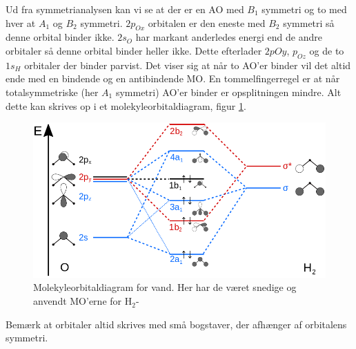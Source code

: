 \documentclass[../main.tex]{subfiles}
\begin{document}
Ud fra symmetrianalysen kan vi se at der er en AO med $B_1$ symmetri og to med hver at $A_1$ og $B_2$ symmetri.
$2p_{Ox}$ orbitalen er den eneste med $B_2$ symmetri så denne orbital binder ikke. $2s_O$ har markant anderledes energi end de andre orbitaler så denne orbital binder heller ikke. Dette efterlader $2p{Oy}$, $p_{Oz}$ og de to $1s_H$ orbitaler der binder parvist. Det viser sig at når to AO'er binder vil det altid ende med en bindende og en antibindende MO. En tommelfingerregel er at når totalsymmetriske (her $A_1$ symmetri) AO'er binder er opsplitningen mindre.
Alt dette kan skrives op i et molekyleorbitaldiagram, figur \ref{fig:amo:MOvand}.
\begin{figure}
    \centering
    \includegraphics[width = \textwidth]{billeder/H2O-MO-Diagram.png}
    \caption{Molekyleorbitaldiagram for vand. Her har de været snedige og anvendt MO'erne for H$_2$-}
    \label{fig:amo:MOvand}
\end{figure}
Bemærk at orbitaler altid skrives med små bogstaver, der afhænger af orbitalens symmetri.
\end{document}
